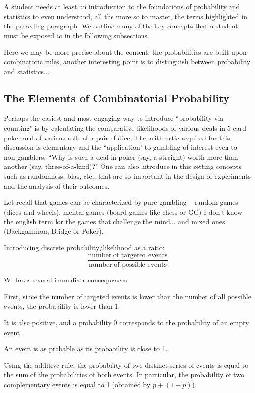 A student needs at least an introduction to the foundations of
probability and statistics to even understand, all the more so to
master, the terms highlighted in the preceding paragraph.  We outline
many of the key concepts that a student must be exposed to in the
following subsections.

{\Denis Here we may be more precise about the content: the probabilities are built upon combinatoric rules, another interesting point is to distinguish between probability and statistics...}



\subsection{The Elements of Combinatorial Probability}

Perhaps the easiest and most engaging way to introduce ``probability
via counting" is by calculating the comparative likelihoods of various
deals in $5$-card poker and of various rolls of a pair of dice.  The
arithmetic required for this discussion is elementary and the
``application" to gambling of interest even to non-gamblers: ``Why is
such a deal in poker (say, a straight) worth more than another (say,
three-of-a-kind)?"  One can also introduce in this setting concepts
such as randomness, bias, etc., that are so important in the design of
experiments and the analysis of their outcomes.

Let recall that games can be characterized by pure gambling -- random games (dices and wheels), 
mental games (board games like chess or GO)
 {\Denis I don't know the english term for the games that challenge the mind...} 
and mixed ones (Backgammon, Bridge or Poker).
\medskip

Introducing discrete probability/likelihood as a ratio:
\[ 
\frac{\mbox{number of targeted events}}{\mbox{number of possible events}}
\]

We have several immediate consequences:

First, since the number of targeted events is lower than the number of all possible events,
the probability is lower than $1$. 

It is also positive, and a probability $0$ corresponds to the probability of an empty event.

An event is as probable as its probability is close to 1.

Using the additive rule, the probability of two distinct series of events is equal to the sum of the probabilities
of both events. 
In particular, the probability of two complementary events is equal to 1 (obtained by $p + (1-p)$).


